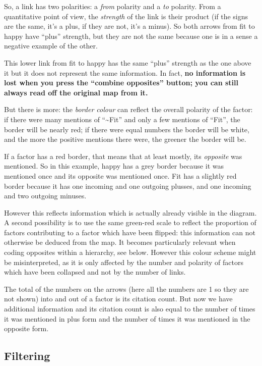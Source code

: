 \documentclass[
]{book}
\begin{document}
So, a link has two polarities: a \emph{from} polarity and a \emph{to} polarity. From a quantitative point of view, the \emph{strength} of the link is their product (if the signs are the same, it's a plus, if they are not, it's a minus). So both arrows from fit to happy have ``plus'' strength, but they are not the same because one is in a sense a negative example of the other.

This lower link from fit to happy has the same ``plus'' strength as the one above it but it does not represent the same information. In fact, \textbf{no information is lost when you press the ``combine opposites'' button; you can still always read off the original map from it.}

But there is more: the \emph{border colour} can reflect the overall polarity of the factor: if there were many mentions of ``\textasciitilde Fit'' and only a few mentions of ``Fit'', the border will be nearly red; if there were equal numbers the border will be white, and the more the positive mentions there were, the greener the border will be.

If a factor has a red border, that means that at least mostly, its \emph{opposite} was mentioned. So in this example, happy has a grey border because it was mentioned once and its opposite was mentioned once. Fit has a slightly red border because it has one incoming and one outgoing plusses, and one incoming and two outgoing minuses.

However this reflects information which is actually already visible in the diagram. A second possibility is to use the same green-red scale to reflect the proportion of factors contributing to a factor which have been flipped: this information can not otherwise be deduced from the map. It becomes particularly relevant when coding opposites within a hierarchy, see below. However this colour scheme might be misinterpreted, as it is only affected by the number and polarity of factors which have been collapsed and not by the number of links.

The total of the numbers on the arrows (here all the numbers are 1 so they are not shown) into and out of a factor is its citation count. But now we have additional information and its citation count is also equal to the number of times it was mentioned in plus form and the number of times it was mentioned in the opposite form.

\hypertarget{filtering}{%
\subsection{Filtering}\label{filtering}}
\end{document}
